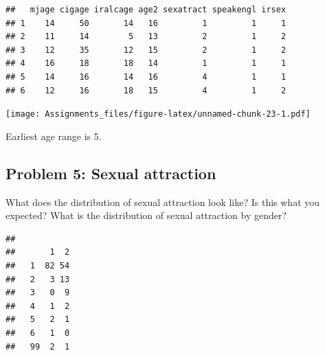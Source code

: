 \documentclass[
]{article}
\newenvironment{Shaded}{\begin{snugshade}}{\end{snugshade}}
\newcommand{\AttributeTok}[1]{\textcolor[rgb]{0.77,0.63,0.00}{#1}}
\newcommand{\CommentTok}[1]{\textcolor[rgb]{0.56,0.35,0.01}{\textit{#1}}}
\newcommand{\ConstantTok}[1]{\textcolor[rgb]{0.00,0.00,0.00}{#1}}
\newcommand{\FunctionTok}[1]{\textcolor[rgb]{0.00,0.00,0.00}{#1}}
\newcommand{\NormalTok}[1]{#1}
\newcommand{\OtherTok}[1]{\textcolor[rgb]{0.56,0.35,0.01}{#1}}
\newcommand{\SpecialCharTok}[1]{\textcolor[rgb]{0.00,0.00,0.00}{#1}}
\newcommand{\StringTok}[1]{\textcolor[rgb]{0.31,0.60,0.02}{#1}}
\begin{document}
\begin{verbatim}
##   mjage cigage iralcage age2 sexatract speakengl irsex
## 1    14     50       14   16         1         1     1
## 2    11     14        5   13         2         1     2
## 3    12     35       12   15         2         1     2
## 4    16     18       18   14         1         1     1
## 5    14     16       14   16         4         1     1
## 6    12     16       18   15         4         1     2
\end{verbatim}

\begin{Shaded}
\end{Shaded}

\texttt{[image: Assignments\_files/figure-latex/unnamed-chunk-23-1.pdf]}

Earliest age range is 5.

\hypertarget{problem-5-sexual-attraction}{%
\subsection{Problem 5: Sexual
attraction}\label{problem-5-sexual-attraction}}

What does the distribution of sexual attraction look like? Is this what
you expected? What is the distribution of sexual attraction by gender?

\begin{Shaded}
\end{Shaded}

\begin{verbatim}
##     
##       1  2
##   1  82 54
##   2   3 13
##   3   0  9
##   4   1  2
##   5   2  1
##   6   1  0
##   99  2  1
\end{verbatim}
\end{document}
